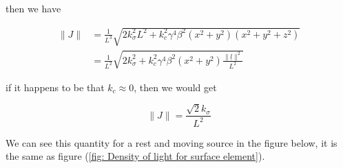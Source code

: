 \begin{derivation}
	then we have

	\begin{equation}
		\begin{aligned}
			\| J \| & = \frac{1}{L^3} \sqrt{ 2 k_\sigma^2 L^2 + k_c^2 \gamma^4 \beta^2  (x^2+y^2)( x^2 + y^2 + z^2 )}          \\
			        & = \frac{1}{L^2} \sqrt{ 2 k_\sigma^2 + k_c^2 \gamma^4 \beta^2 (x^2+y^2) \frac{\|\underline{l}\|^2}{L^2} }
		\end{aligned}
	\end{equation}

\end{derivation}

if it happens to be that $k_c\approx 0$, then we would get

\begin{equation}
	\| J \| = \frac{ \sqrt{2} k_\sigma}{L^2}
\end{equation}

We can see this quantity for a rest and moving source in the figure below, it is the same as figure (\ref{fig: Density of light for surface element}).

